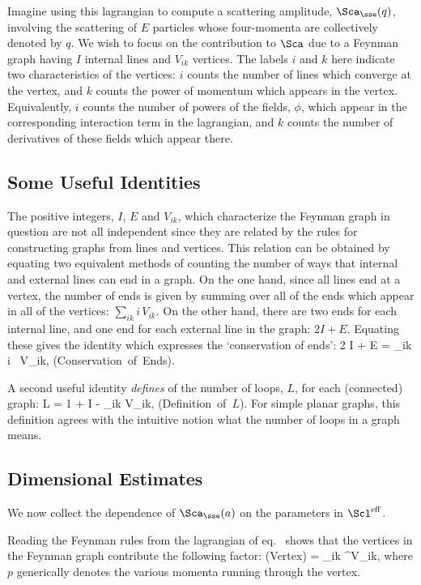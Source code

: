 Imagine using this lagrangian to compute a scattering
amplitude, 
$\Sca_\sse(q)$, involving the scattering of $E$ particles
whose four-momenta are collectively denoted by $q$. We wish
to focus on the contribution to $\Sca$ due to a Feynman
graph having $I$ internal lines and $V_{ik}$ vertices. The
labels $i$ and $k$ here indicate two characteristics of the
vertices: $i$ counts the number of lines which converge at
the vertex, and $k$ counts the power of momentum which
appears in the vertex. Equivalently, $i$ counts the number
of powers of the fields, $\phi$, which appear in the
corresponding interaction term in the lagrangian, and $k$
counts the number of derivatives of these fields which
appear there.

\subsection{Some Useful Identities}

The positive integers, $I$, $E$ and $V_{ik}$, which
characterize the Feynman graph in question are not all
independent since they are related by the rules for
constructing graphs from lines and vertices. This relation
can be obtained by equating two equivalent methods of
counting the number of ways that internal and external
lines can end in a graph. On the one hand, since all lines
end at a vertex, the number of ends is given by summing
over all of the ends which appear in all of the vertices:
$\sum_{ik} i 
\, V_{ik}$. On the other hand, there are two ends for each
internal line, and one end for each external line in the
graph: $2 I + E$. Equating these gives the identity which
expresses the `conservation of ends':
%
\eq
\label{consofends}
2 I + E = \sum_{ik} i \,  V_{ik}, \qquad
\hbox{(Conservation of Ends)}.
\eeq

A second useful identity {\em defines} of the number of
loops, $L$, for each (connected) graph:
%
\eq
\label{loopdef}
L = 1 + I - \sum_{ik} V_{ik}, 
\qquad \hbox{(Definition of $L$)}.
\eeq
%
For simple planar graphs, this definition agrees with the
intuitive notion what the number of loops in a graph means.

\subsection{Dimensional Estimates}

We now collect the dependence of $\Sca_\sse(a)$ on the 
parameters in $\leff$.

Reading the Feynman rules from the lagrangian of
eq.~ shows that the vertices in the Feynman
graph contribute the following factor:
%
\eq
\label{vertexcont}
\hbox{(Vertex)} =  \prod_{ik} ^{V_{ik}},
\eeq
%
where $p$ generically denotes the various momenta running
through the vertex.

